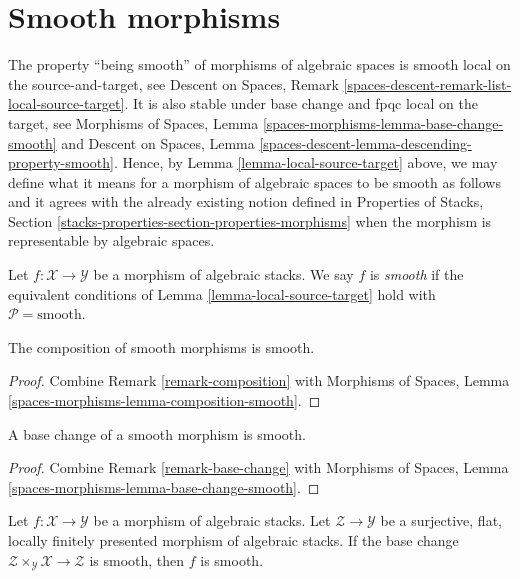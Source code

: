\section{Smooth morphisms}
\label{section-smooth}

\noindent
The property ``being smooth'' of morphisms of algebraic
spaces is smooth local on the source-and-target, see
Descent on Spaces, Remark \ref{spaces-descent-remark-list-local-source-target}.
It is also stable under base change and fpqc local on the target, see
Morphisms of Spaces,
Lemma \ref{spaces-morphisms-lemma-base-change-smooth}
and
Descent on Spaces, Lemma
\ref{spaces-descent-lemma-descending-property-smooth}.
Hence, by
Lemma \ref{lemma-local-source-target}
above, we may define what it means for a morphism of algebraic spaces
to be smooth as follows and it agrees with the already
existing notion defined in
Properties of Stacks,
Section \ref{stacks-properties-section-properties-morphisms}
when the morphism is representable by algebraic spaces.

\begin{definition}
\label{definition-smooth}
Let $f : \mathcal{X} \to \mathcal{Y}$ be a morphism of algebraic stacks.
We say $f$ is {\it smooth} if the equivalent conditions of
Lemma \ref{lemma-local-source-target}
hold with $\mathcal{P} = \text{smooth}$.
\end{definition}

\begin{lemma}
\label{lemma-composition-smooth}
The composition of smooth morphisms is smooth.
\end{lemma}

\begin{proof}
Combine
Remark \ref{remark-composition}
with
Morphisms of Spaces, Lemma
\ref{spaces-morphisms-lemma-composition-smooth}.
\end{proof}

\begin{lemma}
\label{lemma-base-change-smooth}
A base change of a smooth morphism is smooth.
\end{lemma}

\begin{proof}
Combine
Remark \ref{remark-base-change}
with
Morphisms of Spaces, Lemma
\ref{spaces-morphisms-lemma-base-change-smooth}.
\end{proof}

\begin{lemma}
\label{lemma-descent-smooth}
Let $f : \mathcal{X} \to \mathcal{Y}$ be a morphism of algebraic stacks.
Let $\mathcal{Z} \to \mathcal{Y}$ be a surjective, flat, locally finitely
presented morphism of algebraic stacks. If the base change
$\mathcal{Z} \times_\mathcal{Y} \mathcal{X} \to \mathcal{Z}$
is smooth, then $f$ is smooth.
\end{lemma}

